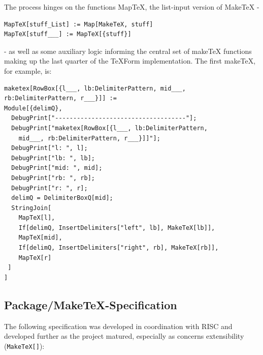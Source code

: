 The process hinges on the functions MapTeX, the list-input version of MakeTeX - 

\begin{verbatim} 
MapTeX[stuff_List] := Map[MakeTeX, stuff]
MapTeX[stuff___] := MapTeX[{stuff}]
\end{verbatim} 

- as well as some auxiliary logic informing the central set of makeTeX functions making up the last quarter of the TeXForm implementation. The first makeTeX, for example, is:

\begin{verbatim}
maketex[RowBox[{l___, lb:DelimiterPattern, mid___, rb:DelimiterPattern, r___}]] :=
Module[{delimQ},
  DebugPrint["------------------------------------"];
  DebugPrint["maketex[RowBox[{l___, lb:DelimiterPattern, 
    mid___, rb:DelimiterPattern, r___}]]"];
  DebugPrint["l: ", l];
  DebugPrint["lb: ", lb];
  DebugPrint["mid: ", mid];
  DebugPrint["rb: ", rb];
  DebugPrint["r: ", r];
  delimQ = DelimiterBoxQ[mid];
  StringJoin[
    MapTeX[l],
    If[delimQ, InsertDelimiters["left", lb], MakeTeX[lb]],
    MapTeX[mid],
    If[delimQ, InsertDelimiters["right", rb], MakeTeX[rb]],
    MapTeX[r]
 ]
]
\end{verbatim}

\subsection{Package/MakeTeX-Specification} \label{concept:spec}

The following specification was developed in coordination with RISC and developed further as the project matured, especially as concerns extensibility (\verb+MakeTeX[]+):


